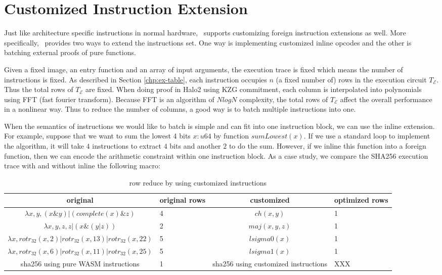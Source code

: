 \section{Customized Instruction Extension}
\label{chp:foreign}
Just like architecture specific instructions in normal hardware, \zkwasm\, supports customizing foreign instruction extensions as well. More specifically, \zkwasm\, provides two ways to extend the instructions set. One way is implementing customized inline opcodes and the other is batching external proofs of pure functions.

Given a fixed image, an entry function and an array of input arguments, the execution trace is fixed which means the number of instructions is fixed. As described in Section \ref{chp:ex-table}, each instruction occupies $n$ (a fixed number of) rows in the execution circuit $T_\mathcal{E}$. Thus the total rows of $T_\mathcal{E}$ are fixed. When doing proof in Halo2 using KZG commitment, each column is interpolated into polynomials using FFT (fast fourier transform). Because FFT is an algorithm of $NlogN$ complexity, the total rows of $T_\mathcal{E}$ affect the overall performance in a nonlinear way. Thus to reduce the number of columns, a good way is to batch multiple instructions into one.

When the semantics of instructions we would like to batch is simple and can fit into one instruction block, we can use the inline extension. For example, suppose that we want to sum the lowest 4 bits $x:u64$ by function $sumLowest(x)$. If we use a standard loop to implement the algorithm, it will take $4$ instructions to extract $4$ bits and another $2$ to do the sum. However, if we inline this function into a foreign function, then we can encode the arithmetic constraint within one instruction block. As a case study, we compare the SHA256 execution trace with and without inline the following macro:

\begin{table}[!h]
\small
\begin{center}
\begin{tabular}{ | c | p{1cm} | c | p{1.5cm} | }
  \hline
  original & original rows & customized & optimized rows\\ 
  \hline
  $\lambda x, y, (x \& y) | (complete(x) \& z)$ & 4 & $ch(x,y)$ & 1 \\
  \hline
  $\lambda x, y, z, z | (x \& (y | z))$ & 2 & $maj(x, y, z)$ & 1\\
  \hline
  $\lambda x, rotr_{32}(x, 2) | rotr_{32}(x, 13) | rotr_{32}(x, 22)$ & 5 & $lsigma0(x)$ & 1 \\
  \hline
  $\lambda x, rotr_{32}(x, 6) | rotr_{32}(x, 11) | rotr_{32}(x, 25)$ & 5 & $lsigma1(x)$ & 1\\
 \hline
   sha256 using pure WASM instructions & 1 & sha256 using customized instructions & XXX\\
 \hline
\end{tabular}
\caption{row reduce by using customized instructions}
\label{tbl:memory-instruction}
\end{center}
\end{table}

